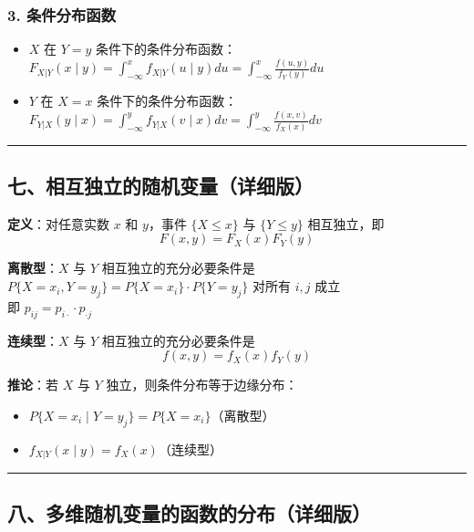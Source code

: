 \documentclass[12pt,a4paper]{ctexart}
\begin{document}
\subsubsection{3. 条件分布函数}
\begin{itemize}[noitemsep]
    \item $X$ 在 $Y = y$ 条件下的条件分布函数：\\
          $F_{X|Y}(x \mid y) = \int_{-\infty}^x f_{X|Y}(u \mid y) du = \int_{-\infty}^x \frac{f(u, y)}{f_Y(y)} du$
    \item $Y$ 在 $X = x$ 条件下的条件分布函数：\\
          $F_{Y|X}(y \mid x) = \int_{-\infty}^y f_{Y|X}(v \mid x) dv = \int_{-\infty}^y \frac{f(x, v)}{f_X(x)} dv$
\end{itemize}

\vspace{1em}\hrule\vspace{1em}

\subsection{七、相互独立的随机变量（详细版）}

\textbf{定义}：对任意实数 $x$ 和 $y$，事件 $\{X \le x\}$ 与 $\{Y \le y\}$ 相互独立，即
\[ F(x, y) = F_X(x) F_Y(y) \]

\textbf{离散型}：$X$ 与 $Y$ 相互独立的充分必要条件是\\
$P\{X = x_i, Y = y_j\} = P\{X = x_i\} \cdot P\{Y = y_j\}$ 对所有 $i, j$ 成立\\
即 $p_{ij} = p_{i\cdot} \cdot p_{\cdot j}$

\textbf{连续型}：$X$ 与 $Y$ 相互独立的充分必要条件是
\[ f(x, y) = f_X(x) f_Y(y) \]

\textbf{推论}：若 $X$ 与 $Y$ 独立，则条件分布等于边缘分布：
\begin{itemize}[noitemsep]
    \item $P\{X = x_i \mid Y = y_j\} = P\{X = x_i\}$（离散型）
    \item $f_{X|Y}(x \mid y) = f_X(x)$（连续型）
\end{itemize}

\vspace{1em}\hrule\vspace{1em}

\subsection{八、多维随机变量的函数的分布（详细版）}
\end{document}
